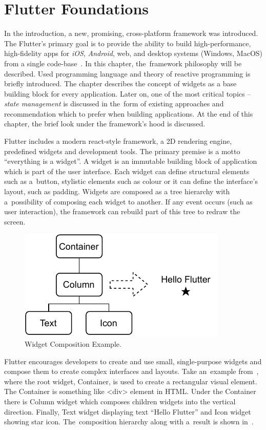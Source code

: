 \chapter{Flutter Foundations}
\label{ch:flutter}
In the introduction, a new, promising, cross-platform framework was introduced. The Flutter's primary goal is to provide the ability to build high-performance, high-fidelity apps for \textit{iOS}, \textit{Android}, web, and desktop systems (Windows, MacOS) from a single code-base~\cite{flutter-technical-overview}. In this chapter, the~framework philosophy will be described. Used programming language and theory of reactive programming is briefly introduced. The chapter describes the concept of widgets as a base building block for every application. Later on, one of the most critical topics -- \textit{state management} is discussed in the~form of existing approaches and recommendation which to prefer when building applications. At the end of this chapter, the brief look under the framework's hood is discussed.

Flutter includes a modern react-style framework, a 2D rendering engine, predefined widgets and development tools. The primary premise is a motto ``everything is a widget''. A widget is an immutable building block of application which is part of the user interface. Each widget can define structural elements such as a~button, stylistic elements such as colour or it can define the interface's layout, such as padding. Widgets are composed as a tree hierarchy with a~possibility of composing each widget to another. If any event occurs (such as user interaction), the framework can rebuild part of this tree to redraw the screen.  

\begin{figure}[htp]
    \centering
    \includegraphics[width=0.5\linewidth]{img/flutter/hello-flutter.pdf}
    \caption{Widget Composition Example.}
    \label{fig:hello-flutter}
\end{figure}

Flutter encourages developers to create and use small, single-purpose widgets and compose them to create complex interfaces and layouts. Take an~example from~, where the root widget, Container, is used to create a rectangular visual element. The Container is something like <div> element in HTML. Under the Container there is Column widget which composes children widgets into the vertical direction. Finally, Text widget displaying text ``Hello Flutter'' and Icon widget showing star icon. The~composition hierarchy along with a~result is shown in~.

